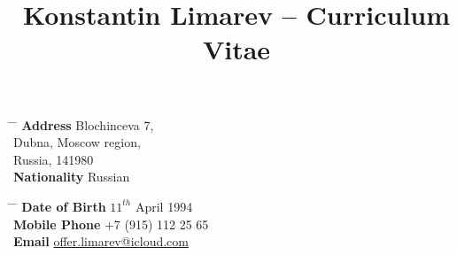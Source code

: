 \documentclass[10pt]{article} %
\begin{document}

\title{Konstantin Limarev -- Curriculum Vitae} %


\parbox{0.5\textwidth}{ %
\begin{tabbing} %
\hspace{3cm} \= \hspace{4cm} \= \kill %
{\bf Address} \> Blochinceva 7,\\ %
\> Dubna, Moscow region, \\ %
\> Russia, 141980 \\ %
{\bf Nationality} \> Russian %
\end{tabbing}}
\hfill %
\parbox{0.5\textwidth}{ %
\begin{tabbing} %
\hspace{3cm} \= \hspace{4cm} \= \kill %
{\bf Date of Birth} \> $11^{th}$ April 1994 \\ %
{\bf Mobile Phone} \> +7 (915) 112 25 65 \\ %
{\bf Email} \> \href{mailto:offer.limarev@icloud.com}{offer.limarev@icloud.com} \\ %
\end{tabbing}}



\end{document}
